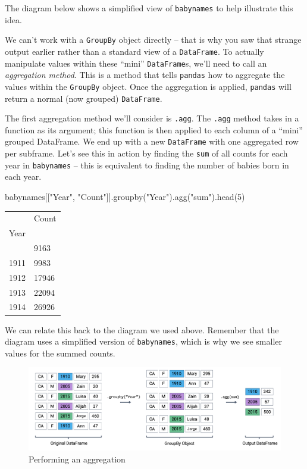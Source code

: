 \documentclass[
  letterpaper,
  DIV=11,
  numbers=noendperiod]{scrreprt}
\newenvironment{Shaded}{\begin{snugshade}}{\end{snugshade}}
\newcommand{\DecValTok}[1]{\textcolor[rgb]{0.68,0.00,0.00}{#1}}
\newcommand{\NormalTok}[1]{\textcolor[rgb]{0.00,0.23,0.31}{#1}}
\newcommand{\StringTok}[1]{\textcolor[rgb]{0.13,0.47,0.30}{#1}}
\begin{document}
The diagram below shows a simplified view of \texttt{babynames} to help
illustrate this idea.

We can't work with a \texttt{GroupBy} object directly -- that is why you
saw that strange output earlier rather than a standard view of a
\texttt{DataFrame}. To actually manipulate values within these ``mini''
\texttt{DataFrame}s, we'll need to call an \emph{aggregation method}.
This is a method that tells \texttt{pandas} how to aggregate the values
within the \texttt{GroupBy} object. Once the aggregation is applied,
\texttt{pandas} will return a normal (now grouped) \texttt{DataFrame}.

The first aggregation method we'll consider is \texttt{.agg}. The
\texttt{.agg} method takes in a function as its argument; this function
is then applied to each column of a ``mini'' grouped DataFrame. We end
up with a new \texttt{DataFrame} with one aggregated row per subframe.
Let's see this in action by finding the \texttt{sum} of all counts for
each year in \texttt{babynames} -- this is equivalent to finding the
number of babies born in each year.

\begin{Shaded}
\begin{Highlighting}[]
\NormalTok{babynames[[}\StringTok{"Year"}\NormalTok{, }\StringTok{"Count"}\NormalTok{]].groupby(}\StringTok{"Year"}\NormalTok{).agg(}\StringTok{"sum"}\NormalTok{).head(}\DecValTok{5}\NormalTok{)}
\end{Highlighting}
\end{Shaded}

\begin{longtable}[]{@{}ll@{}}
\toprule\noalign{}
& Count \\
Year & \\
\midrule\noalign{}
\endhead
\bottomrule\noalign{}
\endlastfoot
1910 & 9163 \\
1911 & 9983 \\
1912 & 17946 \\
1913 & 22094 \\
1914 & 26926 \\
\end{longtable}

We can relate this back to the diagram we used above. Remember that the
diagram uses a simplified version of \texttt{babynames}, which is why we
see smaller values for the summed counts.

\begin{figure}[H]

{\centering \includegraphics{pandas_3/images/agg.png}

}

\caption{Performing an aggregation}

\end{figure}%
\end{document}
